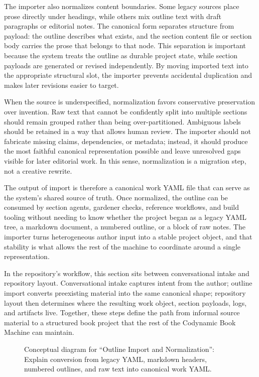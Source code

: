 The importer also normalizes content boundaries. Some legacy sources place prose directly under headings, while others mix outline text with draft paragraphs or editorial notes. The canonical form separates structure from payload: the outline describes what exists, and the section content file or section body carries the prose that belongs to that node. This separation is important because the system treats the outline as durable project state, while section payloads are generated or revised independently. By moving imported text into the appropriate structural slot, the importer prevents accidental duplication and makes later revisions easier to target.

When the source is underspecified, normalization favors conservative preservation over invention. Raw text that cannot be confidently split into multiple sections should remain grouped rather than being over-partitioned. Ambiguous labels should be retained in a way that allows human review. The importer should not fabricate missing claims, dependencies, or metadata; instead, it should produce the most faithful canonical representation possible and leave unresolved gaps visible for later editorial work. In this sense, normalization is a migration step, not a creative rewrite.

The output of import is therefore a canonical work YAML file that can serve as the system's shared source of truth. Once normalized, the outline can be consumed by section agents, gardener checks, reference workflows, and build tooling without needing to know whether the project began as a legacy YAML tree, a markdown document, a numbered outline, or a block of raw notes. The importer turns heterogeneous author input into a stable project object, and that stability is what allows the rest of the machine to coordinate around a single representation.

In the repository's workflow, this section sits between conversational intake and repository layout. Conversational intake captures intent from the author; outline import converts preexisting material into the same canonical shape; repository layout then determines where the resulting work object, section payloads, logs, and artifacts live. Together, these steps define the path from informal source material to a structured book project that the rest of the Codynamic Book Machine can maintain.

\begin{figure}[htbp]
\centering

\caption{Conceptual diagram for ``Outline Import and Normalization'': Explain conversion from legacy YAML, markdown headers, numbered outlines, and raw text into canonical work YAML.}
\end{figure}
